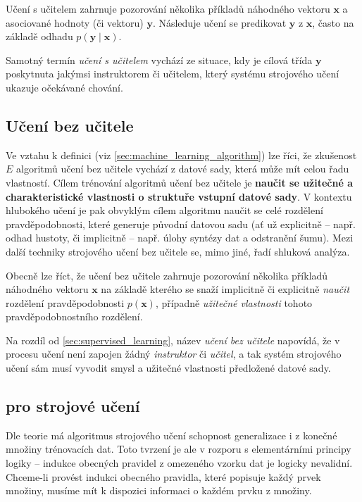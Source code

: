 Učení s učitelem zahrnuje pozorování několika příkladů náhodného vektoru $\mathbf{x}$ a asociované hodnoty (či vektoru) $\mathbf{y}$.
Následuje učení se predikovat $\mathbf{y}$ z $\mathbf{x}$, často na základě odhadu $p(\mathbf{y}\mid\mathbf{x})$.

Samotný termín \emph{učení s učitelem} vychází ze situace, kdy je cílová třída $\mathbf{y}$ poskytnuta jakýmsi instruktorem či učitelem, který systému strojového učení ukazuje očekávané chování. \cite{Goodfellow2016}
\subsection{Učení bez učitele}
\label{sec:unsupervised_learning}
Ve vztahu k definici (viz \autoref{sec:machine_learning_algorithm}) lze říci, že zkušenost $E$ algoritmů učení bez učitele vychází z datové sady, která může mít celou řadu vlastností.
Cílem trénování algoritmů učení bez učitele je \textbf{naučit se užitečné a charakteristické vlastnosti o struktuře vstupní datové sady}.
V kontextu hlubokého učení je pak obvyklým cílem algoritmu naučit se celé rozdělení pravděpodobnosti, které generuje původní datovou sadu (ať už explicitně – např. odhad hustoty, či implicitně – např. úlohy syntézy dat a odstranění šumu).
Mezi další techniky strojového učení bez učitele se, mimo jiné, řadí shluková analýza.

Obecně lze říct, že učení bez učitele zahrnuje pozorování několika příkladů náhodného vektoru $\mathbf{x}$ na základě kterého se snaží implicitně či explicitně \emph{naučit} rozdělení pravděpodobnosti $p(\mathbf{x})$, případně \emph{užitečné vlastnosti} tohoto pravděpodobnostního rozdělení.

Na rozdíl od \autoref{sec:supervised_learning}, název \emph{učení bez učitele} napovídá, že v procesu učení není zapojen žádný \emph{instruktor} či \emph{učitel}, a tak systém strojového učení sám musí vyvodit smysl a užitečné vlastnosti předložené datové sady. \cite{Goodfellow2016}
\subsection{ pro strojové učení}
\label{sec:no_free_lunch}
Dle teorie má algoritmus strojového učení schopnost generalizace i z konečné množiny trénovacích dat. 
Toto tvrzení je ale v rozporu s elementárními principy logiky – indukce obecných pravidel z omezeného vzorku dat je logicky nevalidní.
Chceme-li provést indukci obecného pravidla, které popisuje každý prvek množiny, musíme mít k dispozici informaci o každém prvku z množiny.  \cite{Goodfellow2016}

